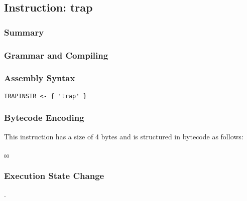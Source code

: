 \subsection{Instruction: trap}

\subsubsection{Summary}


\subsubsection{Grammar and Compiling}


\subsubsection{Assembly Syntax}

\begin{myquote}
\begin{verbatim}
TRAPINSTR <- { 'trap' }
\end{verbatim}
\end{myquote}


\subsubsection{Bytecode Encoding}

This instruction has a size of 4 bytes and is structured in bytecode as follows:

$_{00}$\ 


\subsubsection{Execution State Change}

.


